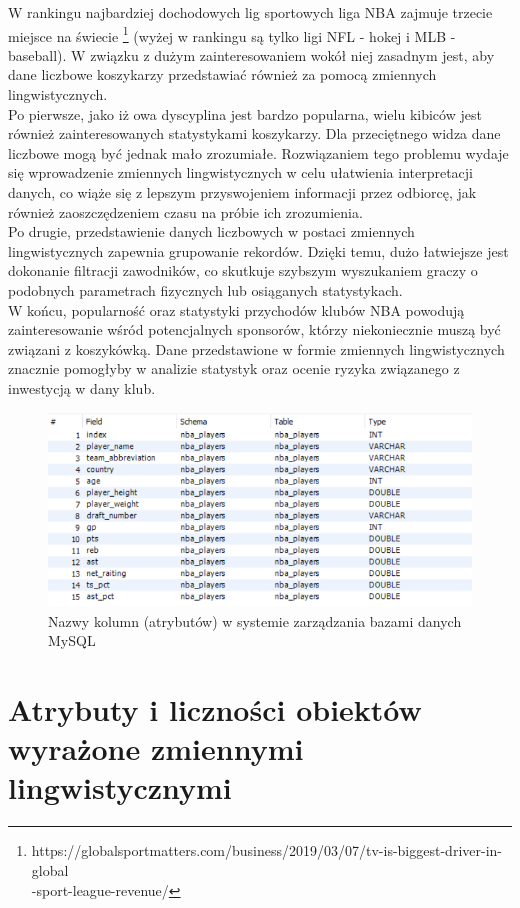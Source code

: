 \documentclass{classrep}
\begin{document}
 W rankingu najbardziej dochodowych lig sportowych liga NBA zajmuje trzecie miejsce na świecie 
 \footnote {https://globalsportmatters.com/business/2019/03/07/tv-is-biggest-driver-in-global\\-sport-league-revenue/}
(wyżej w rankingu są tylko ligi NFL - hokej i MLB - baseball). W związku z dużym zainteresowaniem wokół niej zasadnym jest, aby dane liczbowe koszykarzy przedstawiać również za pomocą zmiennych lingwistycznych. \\
 \indent Po pierwsze, jako iż owa dyscyplina jest bardzo popularna, wielu kibiców jest również zainteresowanych statystykami koszykarzy. Dla przeciętnego widza dane liczbowe mogą być jednak mało zrozumiałe. Rozwiązaniem tego problemu wydaje się wprowadzenie zmiennych lingwistycznych w celu ułatwienia interpretacji danych, co wiąże się z lepszym przyswojeniem informacji przez odbiorcę, jak również zaoszczędzeniem czasu na próbie ich zrozumienia. \\
 \indent Po drugie, przedstawienie danych liczbowych w postaci zmiennych lingwistycznych zapewnia grupowanie rekordów. Dzięki temu, dużo łatwiejsze jest dokonanie filtracji zawodników, co skutkuje szybszym wyszukaniem graczy o podobnych parametrach fizycznych lub osiąganych statystykach.\\
 \indent W końcu, popularność oraz statystyki przychodów klubów NBA powodują zainteresowanie wśród potencjalnych sponsorów, którzy niekoniecznie muszą być związani z koszykówką. Dane przedstawione w formie zmiennych lingwistycznych znacznie pomogłyby w analizie statystyk oraz ocenie ryzyka związanego z inwestycją w dany klub. 
 \begin{figure}[H]
    \centering
    \includegraphics[width=14cm]{mysql_tables.png}
    \caption{Nazwy kolumn (atrybutów) w systemie zarządzania bazami danych MySQL}
    \label{rysunek:baza_danych}
\end{figure}

\section{Atrybuty i liczności obiektów wyrażone zmiennymi lingwistycznymi}
\end{document}
